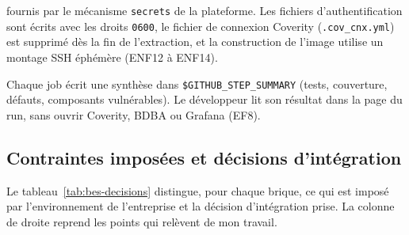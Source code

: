 \begin{description}[style=nextline,leftmargin=0.8cm]
    fournis par le mécanisme \texttt{secrets} de la plateforme. Les fichiers
    d'authentification sont écrits avec les droits \texttt{0600}, le fichier de
    connexion Coverity (\texttt{.cov\_cnx.yml}) est supprimé dès la fin de
    l'extraction, et la construction de l'image utilise un montage SSH éphémère
    (ENF12 à ENF14).
  \item[P6 --- Restituer le résultat là où le développeur regarde déjà] Chaque
    job écrit une synthèse dans \texttt{\$GITHUB\_STEP\_SUMMARY} (tests,
    couverture, défauts, composants vulnérables). Le développeur lit son résultat
    dans la page du run, sans ouvrir Coverity, BDBA ou Grafana (EF8).
\end{description}

\subsection{Contraintes imposées et décisions d'intégration}
\label{ssec:bes-decisions}

Le tableau~\ref{tab:bes-decisions} distingue, pour chaque brique, ce qui est
imposé par l'environnement de l'entreprise et la décision d'intégration prise.
La colonne de droite reprend les points qui relèvent de mon travail.

